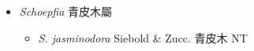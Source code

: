 
  \begin{itemize}
 \item[] \textit{Schoepfia} 青皮木屬
                                
  \begin{itemize}
        \item[] \textit{S. jasminodora} Siebold \& Zucc.  青皮木   NT
  \end{itemize}
  \end{itemize}
